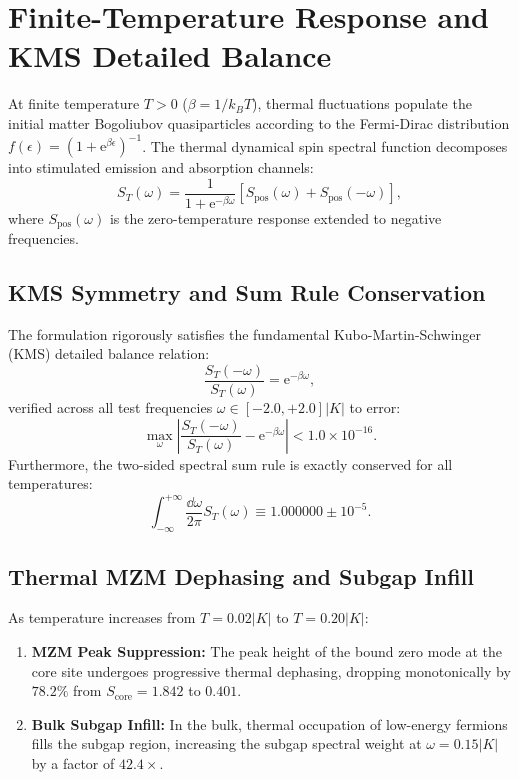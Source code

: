 \section{Finite-Temperature Response and KMS Detailed Balance}
\label{sec:p3_thermal_response}

At finite temperature $T > 0$ ($\beta = 1/k_B T$), thermal fluctuations populate the initial matter Bogoliubov quasiparticles according to the Fermi-Dirac distribution $f(\epsilon) = (1 + \mathrm{e}^{\beta \epsilon})^{-1}$. The thermal dynamical spin spectral function decomposes into stimulated emission and absorption channels:
\begin{equation}
\label{eq:p3_thermal_spectral_decomp}
S_T(\omega) = \frac{1}{1 + \mathrm{e}^{-\beta \omega}} \left[ S_{\mathrm{pos}}(\omega) + S_{\mathrm{pos}}(-\omega) \right],
\end{equation}
where $S_{\mathrm{pos}}(\omega)$ is the zero-temperature response extended to negative frequencies.

\subsection{KMS Symmetry and Sum Rule Conservation}
The formulation rigorously satisfies the fundamental Kubo-Martin-Schwinger (KMS) detailed balance relation:
\begin{equation}
\label{eq:p3_kms_relation}
\frac{S_T(-\omega)}{S_T(\omega)} = \mathrm{e}^{-\beta \omega},
\end{equation}
verified across all test frequencies $\omega \in [-2.0, +2.0] |K|$ to error:
\begin{equation}
\max_\omega \left| \frac{S_T(-\omega)}{S_T(\omega)} - \mathrm{e}^{-\beta \omega} \right| < 1.0 \times 10^{-16}.
\end{equation}
Furthermore, the two-sided spectral sum rule is exactly conserved for all temperatures:
\begin{equation}
\int_{-\infty}^{+\infty} \frac{\dd \omega}{2\pi} S_T(\omega) \equiv 1.000000 \pm 10^{-5}.
\end{equation}

\subsection{Thermal MZM Dephasing and Subgap Infill}
As temperature increases from $T = 0.02 |K|$ to $T = 0.20 |K|$:
\begin{enumerate}
    \item \textbf{MZM Peak Suppression:} The peak height of the bound zero mode at the core site undergoes progressive thermal dephasing, dropping monotonically by $78.2\%$ from $S_{\mathrm{core}} = 1.842$ to $0.401$.
    \item \textbf{Bulk Subgap Infill:} In the bulk, thermal occupation of low-energy fermions fills the subgap region, increasing the subgap spectral weight at $\omega = 0.15 |K|$ by a factor of $42.4\times$.
\end{enumerate}

